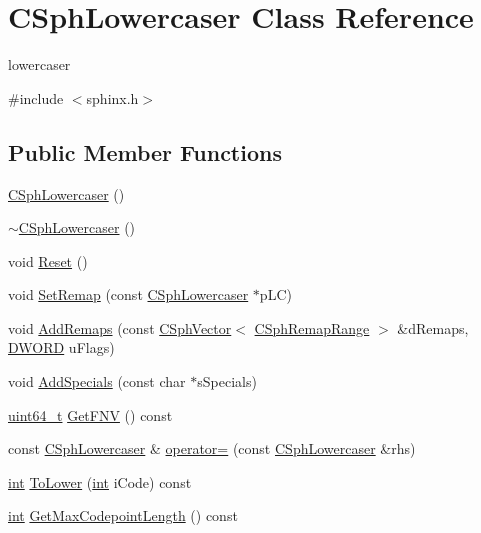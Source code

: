 \hypertarget{classCSphLowercaser}{\section{C\-Sph\-Lowercaser Class Reference}
\label{classCSphLowercaser}
}


lowercaser  




{\ttfamily \#include $<$sphinx.\-h$>$}

\subsection*{Public Member Functions}
\begin{DoxyCompactItemize}
\item 
\hyperlink{classCSphLowercaser_a3e7c6a94d47481dbe143fa259e27bd0b}{C\-Sph\-Lowercaser} ()
\item 
\hyperlink{classCSphLowercaser_a4d9a8ac307caeadce0e3c79973c82daa}{$\sim$\-C\-Sph\-Lowercaser} ()
\item 
void \hyperlink{classCSphLowercaser_a84162b7a7c5b13d33feb851fbef02d2e}{Reset} ()
\item 
void \hyperlink{classCSphLowercaser_a904e4275e421f99aa27bf4244d7d1daf}{Set\-Remap} (const \hyperlink{classCSphLowercaser}{C\-Sph\-Lowercaser} $\ast$p\-L\-C)
\item 
void \hyperlink{classCSphLowercaser_aa69cba8739e0f434bafe1353b39b6738}{Add\-Remaps} (const \hyperlink{classCSphVector}{C\-Sph\-Vector}$<$ \hyperlink{structCSphRemapRange}{C\-Sph\-Remap\-Range} $>$ \&d\-Remaps, \hyperlink{sphinxstd_8h_a798af1e30bc65f319c1a246cecf59e39}{D\-W\-O\-R\-D} u\-Flags)
\item 
void \hyperlink{classCSphLowercaser_a740faf5f56aa360b8f44a95f0de9200f}{Add\-Specials} (const char $\ast$s\-Specials)
\item 
\hyperlink{sphinxstd_8h_aaa5d1cd013383c889537491c3cfd9aad}{uint64\-\_\-t} \hyperlink{classCSphLowercaser_ae3534fe2019df3f3345b08f6bd611192}{Get\-F\-N\-V} () const 
\item 
const \hyperlink{classCSphLowercaser}{C\-Sph\-Lowercaser} \& \hyperlink{classCSphLowercaser_a244f83e7ea5fa47b4012682763500733}{operator=} (const \hyperlink{classCSphLowercaser}{C\-Sph\-Lowercaser} \&rhs)
\item 
\hyperlink{sphinxexpr_8cpp_a4a26e8f9cb8b736e0c4cbf4d16de985e}{int} \hyperlink{classCSphLowercaser_ad8cadae7f74e796971cc932a87267243}{To\-Lower} (\hyperlink{sphinxexpr_8cpp_a4a26e8f9cb8b736e0c4cbf4d16de985e}{int} i\-Code) const 
\item 
\hyperlink{sphinxexpr_8cpp_a4a26e8f9cb8b736e0c4cbf4d16de985e}{int} \hyperlink{classCSphLowercaser_ad2428e48d39fe892b6eadff5ccb441b4}{Get\-Max\-Codepoint\-Length} () const 
\end{DoxyCompactItemize}
